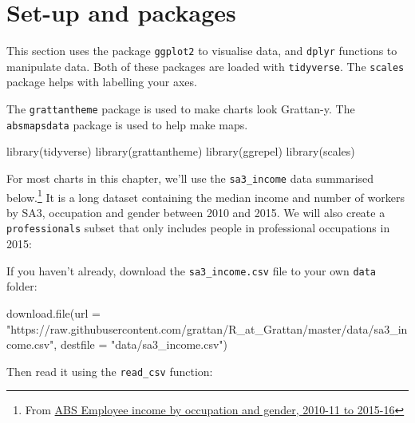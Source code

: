 \documentclass[
]{book}
\newenvironment{Shaded}{\begin{snugshade}}{\end{snugshade}}
\newcommand{\AttributeTok}[1]{\textcolor[rgb]{0.77,0.63,0.00}{#1}}
\newcommand{\FunctionTok}[1]{\textcolor[rgb]{0.00,0.00,0.00}{#1}}
\newcommand{\NormalTok}[1]{#1}
\newcommand{\StringTok}[1]{\textcolor[rgb]{0.31,0.60,0.02}{#1}}
\begin{document}
\hypertarget{set-up-and-packages}{%
\section{Set-up and packages}\label{set-up-and-packages}}

This section uses the package \texttt{ggplot2} to visualise data, and \texttt{dplyr} functions to manipulate data. Both of these packages are loaded with \texttt{tidyverse}. The \texttt{scales} package helps with labelling your axes.

The \texttt{grattantheme} package is used to make charts look Grattan-y. The \texttt{absmapsdata} package is used to help make maps.

\begin{Shaded}
\begin{Highlighting}[]
\FunctionTok{library}\NormalTok{(tidyverse)}
\FunctionTok{library}\NormalTok{(grattantheme)}
\FunctionTok{library}\NormalTok{(ggrepel)}
\FunctionTok{library}\NormalTok{(scales)}
\end{Highlighting}
\end{Shaded}

For most charts in this chapter, we'll use the \texttt{sa3\_income} data summarised below.\footnote{From \href{https://www.abs.gov.au/AUSSTATS/abs@.nsf/DetailsPage/6524.0.55.0022011-2016?OpenDocument}{ABS Employee income by occupation and gender, 2010-11 to 2015-16}} It is a long dataset containing the median income and number of workers by SA3, occupation and gender between 2010 and 2015. We will also create a \texttt{professionals} subset that only includes people in professional occupations in 2015:

If you haven't already, download the \texttt{sa3\_income.csv} file to your own \texttt{data} folder:

\begin{Shaded}
\begin{Highlighting}[]
\FunctionTok{download.file}\NormalTok{(}\AttributeTok{url =} \StringTok{"https://raw.githubusercontent.com/grattan/R\_at\_Grattan/master/data/sa3\_income.csv"}\NormalTok{,}
              \AttributeTok{destfile =} \StringTok{"data/sa3\_income.csv"}\NormalTok{)}
\end{Highlighting}
\end{Shaded}

Then read it using the \texttt{read\_csv} function:
\end{document}
